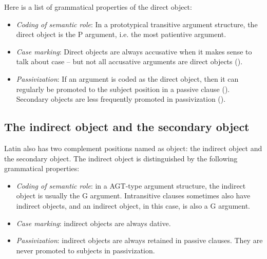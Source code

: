 \documentclass[a4paper, oneside]{report}
\begin{document}
Here is a list of grammatical properties of the direct object:
\begin{itemize}
    \item \emph{Coding of semantic role}: In a prototypical transitive argument structure, 
    the direct object is the P argument, i.e. the most patientive argument. 

    \item \emph{Case marking}: Direct objects are always accusative when it makes sense to talk about case -- 
    but not all accusative arguments are direct objects ().
    \item \emph{Passivization}: If an argument is coded as the direct object, 
    then it can regularly be promoted to the subject position in a passive clause (). 
    Secondary objects are less frequently promoted in passivization ().
\end{itemize}

\subsection{The indirect object and the secondary object}\label{sec:indirect-object}

Latin also has two complement positions named as object:
the indirect object and the secondary object.
The indirect object is distinguished by the following grammatical properties:
\begin{itemize}
    \item \emph{Coding of semantic role}: in a AGT-type argument structure, 
    the indirect object is usually the G argument.
    Intransitive clauses sometimes also have indirect objects, 
    and an indirect object, in this case, is also a G argument.
    \item \emph{Case marking}: indirect objects are always dative.
    \item \emph{Passivization}: indirect objects are always retained in passive clauses. 
    They are never promoted to subjects in passivization.
\end{itemize}
\end{document}
